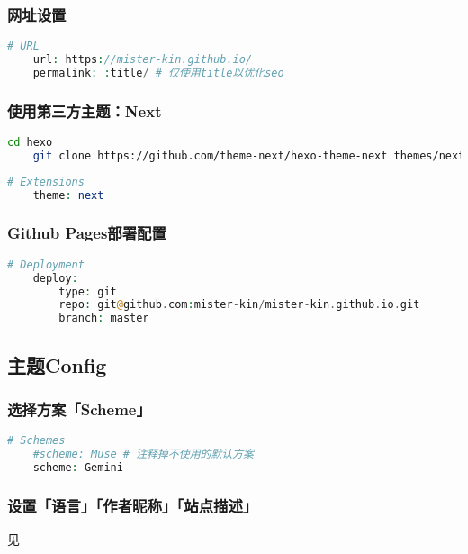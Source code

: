 \subsubsection{网址设置}
\begin{lstlisting}[language={PHP},title={搜索站点Config.yml相关代码并修改}]
    # URL
    url: https://mister-kin.github.io/
    permalink: :title/ # 仅使用title以优化seo
\end{lstlisting}

\subsubsection{使用第三方主题：Next}

\begin{lstlisting}[language={bash},title={下载安装Next主题}]
    cd hexo
    git clone https://github.com/theme-next/hexo-theme-next themes/next
\end{lstlisting}

\begin{lstlisting}[language={PHP},title={搜索站点Config.yml相关代码并修改}]
    # Extensions
    theme: next
\end{lstlisting}

\subsubsection{Github Pages部署配置}
\begin{lstlisting}[language={PHP},title={搜索站点Config.yml相关代码并修改}]
    # Deployment
    deploy:
        type: git
        repo: git@github.com:mister-kin/mister-kin.github.io.git
        branch: master
\end{lstlisting}

\subsection{主题Config}
\subsubsection{选择方案「Scheme」}
\begin{lstlisting}[language={PHP},title={搜索主题Config.yml相关代码并修改}]
    # Schemes
    #scheme: Muse # 注释掉不使用的默认方案
    scheme: Gemini
\end{lstlisting}

\subsubsection{设置「语言」「作者昵称」「站点描述」}
见

